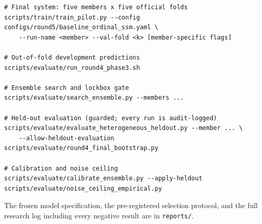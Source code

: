 \documentclass[11pt]{article}
\begin{document}
\begin{verbatim}
# Final system: five members x five official folds
scripts/train/train_pilot.py --config configs/round5/baseline_ordinal_ssm.yaml \
    --run-name <member> --val-fold <k> [member-specific flags]

# Out-of-fold development predictions
scripts/evaluate/run_round4_phase3.sh

# Ensemble search and lockbox gate
scripts/evaluate/search_ensemble.py --members ...

# Held-out evaluation (guarded; every run is audit-logged)
scripts/evaluate/evaluate_heterogeneous_heldout.py --member ... \
    --allow-heldout-evaluation
scripts/evaluate/round4_final_bootstrap.py

# Calibration and noise ceiling
scripts/evaluate/calibrate_ensemble.py --apply-heldout
scripts/evaluate/noise_ceiling_empirical.py
\end{verbatim}

The frozen model specification, the pre-registered selection protocol, and the full
research log including every negative result are in \texttt{reports/}.
\end{document}
